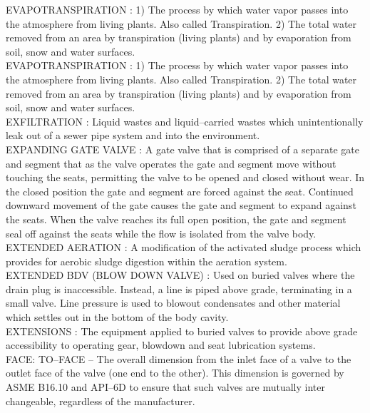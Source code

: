 \vspace{0.15cm}
EVAPOTRANSPIRATION :  1) The process by which water vapor passes into the atmosphere from living plants. Also called Transpiration.  2) The total water removed from an area by transpiration (living plants) and by evaporation from soil, snow and water surfaces.\\
\vspace{0.15cm}
EVAPOTRANSPIRATION :  1) The process by which water vapor passes into the atmosphere from living plants. Also called Transpiration.  2) The total water removed from an area by transpiration (living plants) and by evaporation from soil, snow and water surfaces.\\
\vspace{0.15cm}
EXFILTRATION :  Liquid wastes and liquid–carried wastes which unintentionally leak out of a sewer pipe system and into the environment. \\
\vspace{0.15cm}
EXPANDING GATE VALVE :   A gate valve that is comprised of a separate gate and segment that as the valve operates the gate and segment move without touching the seats, permitting the valve to be opened and closed without wear. In the closed position the gate and segment are forced against the seat. Continued downward movement of the gate causes the gate and segment to expand against the seats. When the valve reaches its full open position, the gate and segment seal off against the seats while the flow is isolated from the valve body.\\
\vspace{0.15cm}
EXTENDED AERATION :   A modification of the activated sludge process which provides for aerobic sludge digestion within the aeration system.\\
\vspace{0.15cm}
EXTENDED BDV (BLOW DOWN VALVE) :   Used on buried valves where the drain plug is inaccessible. Instead, a line is piped above grade, terminating in a small valve. Line pressure is used to blowout condensates and other material which settles out in the bottom of the body cavity.\\
\vspace{0.15cm}
EXTENSIONS :   The equipment applied to buried valves to provide above grade accessibility to operating gear, blowdown and seat lubrication systems.\\
\vspace{0.15cm}
FACE: TO–FACE –  The overall dimension from the inlet face of a valve to the outlet face of the valve (one end to the other). This dimension is governed by ASME B16.10 and API–6D to ensure that such valves are mutually inter changeable, regardless of the manufacturer.\\
